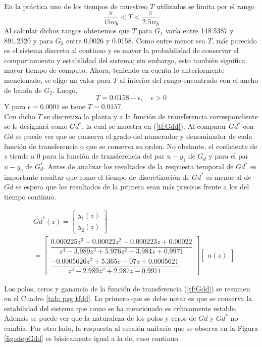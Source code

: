 \documentclass[journal]{IEEEtran}
\begin{document}
En la práctica uno de los tiempos de muestreo $T$ utilizados se limita por el rango $$\frac{\pi}{15w_b}<T<\frac{\pi}{2.5w_b}$$
Al calcular dichos rangos obtenemos que $T$ para $G_1$ varía entre 148.5387 y 891.2320 y para $G_2$ entre 0.0026 y 0.0158. Como entre menor sea $T$, más parecido es el sistema discreto al continuo y es mayor la probabilidad de conservar el comportamiento y estabilidad del sistema; sin embargo, esto también significa mayor tiempo de computo. Ahora, teniendo en cuenta lo anteriormente mencionado, se elige un valor para $T$ al interior del rango encontrado con el ancho de banda de $G_2$. Luego, $$T=0.0158-\epsilon, \quad \epsilon>0$$
Y para $\epsilon=0.0001$ se tiene $T=0.0157$.\\

Con dicho $T$ se discretiza la planta y a la función de transferencia correspondiente se le designará como $Gd^*$, la cual se muestra en (\ref{tf:Gdd}). Al comparar $Gd^*$ con $Gd$ se puede ver que se conserva el grado del numerador y denominador de cada función de transferencia o que se conserva su orden. No obstante, el coeficiente de $z$ tiende a 0 para la función de transferencia del par $u-y_1$ de $G_d$ y para el par $u-y_2$ de $G_d^*$. Antes de analizar los resultados de la respuesta temporal de $Gd^*$ es importante resaltar que como el tiempo de discretización de $Gd^*$ es menor al de $Gd$ se espera que los resultados de la primera sean más precisos frente a los del tiempo continuo.   

\begin{equation}
\label{tf:Gdd}
\begin{aligned}
&Gd^*(z) = \begin{bmatrix}
	y_1(z)\\
	y_2(z)
\end{bmatrix} \\
& = 
\begin{bmatrix}
\dfrac{0.000225 z^3 - 0.00022 z^2 - 0.000223 z  + 0.00022}{z^4 - 3.989 z^3 + 5.976 z^2 - 3.984 z + 0.9971}\\
\dfrac{ -0.0005626 z^2 + 5.365e-07 z + 0.0005621}{z^3 - 2.989 z^2 + 2.987 z - 0.9971}
\end{bmatrix}
\begin{bmatrix}
	u(z)
\end{bmatrix}
\end{aligned}
\end{equation}
\textbf{}

Los polos, ceros y ganancia de la función de transferencia (\ref{tf:Gdd}) se resumen en el Cuadro \ref{tab: pzg tfdd}. Lo primero que se debe notar es que se conserva la estabilidad del sistema que como se ha mencionado es críticamente estable. Además se puede ver que la naturaleza de los polos y ceros de $Gd$ y $Gd^*$ no cambia. Por otro lado, la respuesta al escalón unitario que se observa en la Figura \ref{fig:stepGdd} es básicamente igual a la del caso continuo.\\
\end{document}
